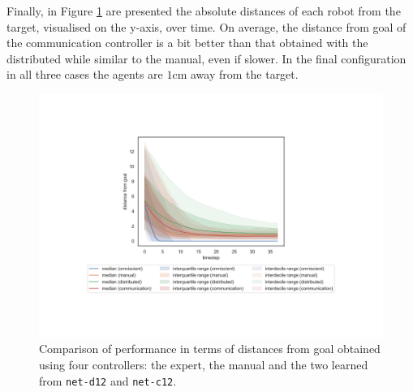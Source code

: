 Finally, in Figure \ref{fig:net-c12distance} are presented the absolute distances of 
each robot from the target, visualised on the y-axis, over time.
On average, the distance from goal of the communication controller is a bit better 
than that obtained with the distributed while similar to the manual, even if slower. 
In the final configuration in all three cases the agents are $1$\gls{cm} away from 
the target. 
\begin{figure}[H]
	\centering
	\includegraphics[width=.65\textwidth]{contents/images/net-c12/distances-from-goal-compressed-communication}%
	\caption[Evaluation of \texttt{net-c12} distances from goal.]{Comparison of 
		performance in terms of distances from goal obtained using four controllers: 
		the expert, the manual and the two learned from \texttt{net-d12} and 
		\texttt{net-c12}.}
	\label{fig:net-c12distance}
\end{figure}

